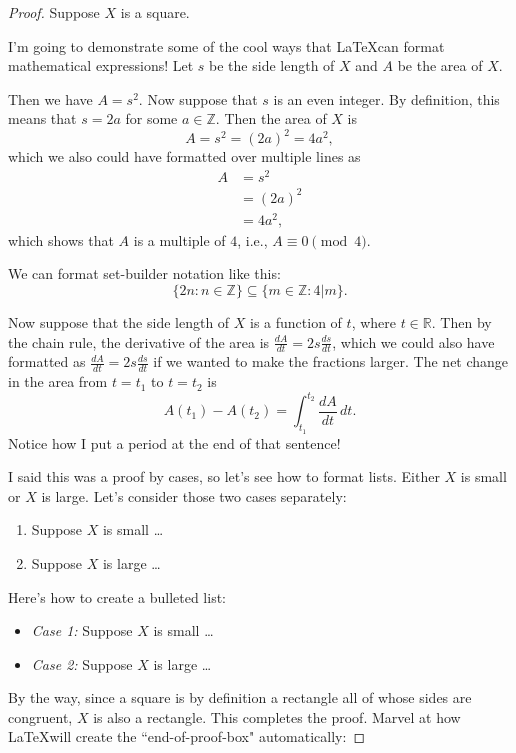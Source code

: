 \documentclass[12pt]{article} %
\theoremstyle{definition}
\begin{document}
\begin{proof}
 Suppose $X$ is a square.
 
 I'm going to demonstrate some of the cool ways
 that \LaTeX  can format mathematical expressions!
 Let $s$ be the side length of $X$
 and $A$ be the area of $X$.

 Then we have $A = s^2$.
 Now suppose that $s$ is an even integer.
 By definition, this means that $s = 2a$ for some $a \in \mathbb{Z}$.
 Then the area of $X$ is
 \begin{equation*}
     A = s^2 = (2a)^2 = 4a^2,
 \end{equation*}
 which we also could have formatted over multiple lines as
  \begin{align*}
     A &= s^2 \\
     &= (2a)^2 \\
     &= 4a^2,
 \end{align*}
 which shows that $A$ is a multiple of $4$,
 i.e., $A \equiv 0 \pmod{4}$.
 
 We can format set-builder notation like this:
 \begin{equation*}
     \{ 2n : n \in \mathbb{Z} \} \subseteq \{ m \in \mathbb{Z} : 4|m \}.
 \end{equation*}
 
 Now suppose that the side length of $X$
 is a function of $t$, where $t \in \mathbb{R}$.
 Then by the chain rule, the derivative of
 the area is $\frac{dA}{dt} = 2s \frac{ds}{dt}$,
 which we could also have formatted as
 $\displaystyle \frac{dA}{dt} = 2s \frac{ds}{dt}$
 if we wanted to make the fractions larger.
 The net change in the area from $t=t_1$
 to $t=t_2$ is
 \begin{equation*}
     A(t_1) - A(t_2) = \int_{t_1}^{t_2} \frac{dA}{dt} \, dt.
 \end{equation*}
 Notice how I put a period at the end of that sentence!
 
 I said this was a proof by cases, so let's see how to format lists.
Either $X$ is small or $X$ is large. Let's consider those two cases separately:
\begin{enumerate}
    \item Suppose $X$ is small \dots
    \item Suppose $X$ is large \dots
\end{enumerate}
Here's how to create a bulleted list:
\begin{itemize}
    \item \textit{Case 1:} Suppose $X$ is small \dots
    \item \textit{Case 2:} Suppose $X$ is large \dots
\end{itemize}
 
 By the way, since a square is by definition
 a rectangle all of whose sides are congruent,
 $X$ is also a rectangle.
 This completes the proof.
 Marvel at how \LaTeX will create the ``end-of-proof-box"
 automatically:
\end{proof}
\end{document}
